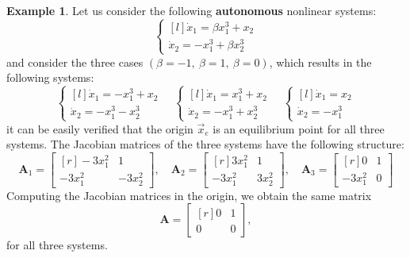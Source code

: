 \documentclass[11pt,a4paper,oneside]{book}
\numberwithin{equation}{section}
\theoremstyle{it}
\theoremstyle{definition}
\newtheorem{example}{Example}[chapter]
\begin{document}
\begin{example}
	Let us consider the following \textbf{autonomous} nonlinear systems:
	\begin{equation*}\label{eqlyap0}
		\left\lbrace 
		\begin{matrix*}[l]
			\dot{x}_1 = \beta x_1^3+x_2 \\[6pt]
			\dot{x}_2 = -x_1^3 + \beta x_2^3
		\end{matrix*}
		\right. 
	\end{equation*}
	and consider the three cases $\left( \beta = -1, \ \beta = 1, \ \beta = 
	0\right) $, which results in the following systems:
	\begin{equation*}\label{eqlyap5}
		\left\lbrace 
		\begin{matrix*}[l]
			\dot{x}_1 = -x_1^3+x_2 \\[6pt]
			\dot{x}_2 = -x_1^3-x_2^3
		\end{matrix*}
		\right. 
		\quad
		\left\lbrace
		\begin{matrix*}[l]
			\dot{x}_1 = x_1^3+x_2 \\[6pt]
			\dot{x}_2 = -x_1^3+x_2^3
		\end{matrix*}\right. 
		\quad
		\left\lbrace
		\begin{matrix*}[l]
			\dot{x}_1 = x_2 \\[6pt]
			\dot{x}_2 = -x_1^3
		\end{matrix*}\right. 
	\end{equation*}
	it can be easily verified that the origin $\vec{x}_e$ is an equilibrium 
	point for all three systems. The Jacobian matrices of the three systems 
	have the following structure:
	\begin{equation*}\label{eqlyap6}
		\mathbf{A}_1 =
		\begin{bmatrix*}[r]
			-3x_1^2 & 1 \\[6pt]
			-3x_1^2 & -3x_2^2
		\end{bmatrix*},
		\quad
		\mathbf{A}_2 =
		\begin{bmatrix*}[r]
			3x_1^2 & 1 \\[6pt]
			-3x_1^2 & 3x_2^2
		\end{bmatrix*},
		\quad
		\mathbf{A}_3 =
		\begin{bmatrix*}[r]
			0 & 1 \\[6pt]
			-3x_1^2 & 0
		\end{bmatrix*}
	\end{equation*}
	Computing the Jacobian matrices in the origin, we obtain the same matrix
	\begin{equation*}\label{eqlyap7}
		\mathbf{A} =
		\begin{bmatrix*}[r]
			0 & 1 \\[6pt]
			0 & 0
		\end{bmatrix*},
	\end{equation*}
	for all three systems.
	

\end{example}
\end{document}
